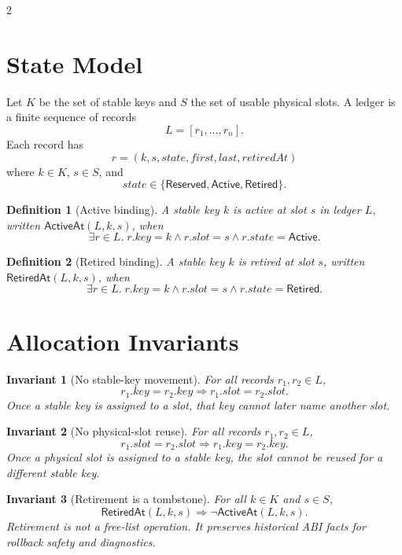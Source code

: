 \documentclass[11pt]{article}
\newtheorem{definition}{Definition}
\newtheorem{invariant}{Invariant}
\begin{document}
\begin{multicols}{2}
\section{State Model}

Let \(K\) be the set of stable keys and \(S\) the set of usable physical slots.
A ledger is a finite sequence of records
\[
  L = [r_1,\ldots,r_n].
\]
Each record has
\[
  r = (k, s, state, first, last, retiredAt)
\]
where \(k \in K\), \(s \in S\), and
\[
  state \in \{\mathsf{Reserved}, \mathsf{Active}, \mathsf{Retired}\}.
\]

\begin{definition}[Active binding]
A stable key \(k\) is active at slot \(s\) in ledger \(L\), written
\(\mathsf{ActiveAt}(L,k,s)\), when
\[
  \exists r \in L.\; r.key = k \land r.slot = s
  \land r.state = \mathsf{Active}.
\]
\end{definition}

\begin{definition}[Retired binding]
A stable key \(k\) is retired at slot \(s\), written
\(\mathsf{RetiredAt}(L,k,s)\), when
\[
  \exists r \in L.\; r.key = k \land r.slot = s
  \land r.state = \mathsf{Retired}.
\]
\end{definition}

\section{Allocation Invariants}

\begin{invariant}[No stable-key movement]
For all records \(r_1,r_2 \in L\),
\[
  r_1.key = r_2.key \Rightarrow r_1.slot = r_2.slot.
\]
Once a stable key is assigned to a slot, that key cannot later name another
slot.
\end{invariant}

\begin{invariant}[No physical-slot reuse]
For all records \(r_1,r_2 \in L\),
\[
  r_1.slot = r_2.slot \Rightarrow r_1.key = r_2.key.
\]
Once a physical slot is assigned to a stable key, the slot cannot be reused for
a different stable key.
\end{invariant}

\begin{invariant}[Retirement is a tombstone]
For all \(k \in K\) and \(s \in S\),
\[
  \mathsf{RetiredAt}(L,k,s) \Rightarrow
  \neg \mathsf{ActiveAt}(L,k,s).
\]
Retirement is not a free-list operation. It preserves historical ABI facts for
rollback safety and diagnostics.
\end{invariant}


\end{multicols}
\end{document}
